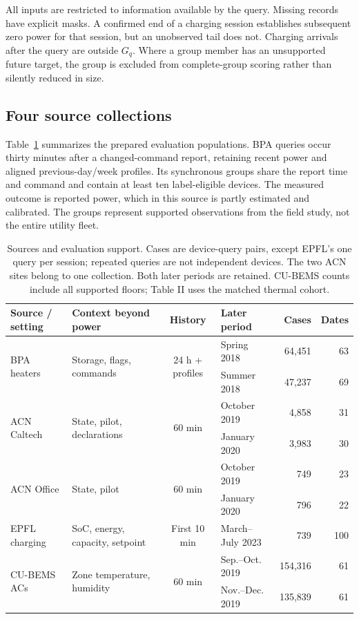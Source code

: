 \documentclass[conference,a4paper]{IEEEtran}
\begin{document}
All inputs are restricted to information available by the query. Missing
records have explicit masks. A confirmed end of a charging session
establishes subsequent zero power for that session, but an unobserved tail
does not. Charging arrivals after the query are outside $G_q$. Where a
group member has an unsupported future target, the group is excluded from
complete-group scoring rather than silently reduced in size.

\subsection{Four source collections}
Table~\ref{tab:sources} summarizes the prepared evaluation populations.
BPA queries occur thirty minutes after a changed-command report, retaining
recent power and aligned previous-day/week profiles. Its synchronous groups
share the report time and command and contain at least ten label-eligible
devices. The measured outcome is reported power, which in this source is
partly estimated and calibrated. The groups represent supported observations
from the field study, not the entire utility fleet.

\begin{table}[t]
\caption{Sources and evaluation support. Cases are device-query pairs, except
EPFL's one query per session; repeated queries are not independent devices.
The two ACN sites belong to one collection. Both later periods are retained.
CU-BEMS counts include all supported floors; Table II uses the matched thermal cohort.}
\label{tab:sources}
\centering\small
\setlength{\tabcolsep}{4pt}
\begin{tabular}{@{}llclrr@{}}
\toprule
Source / setting & Context beyond power & History & Later period & Cases & Dates\\
\midrule
\multirow{2}{*}{BPA heaters} & \multirow{2}{*}{Storage, flags, commands} & \multirow{2}{*}{24 h + profiles} & Spring 2018 &64,451&63\\
&&&Summer 2018&47,237&69\\
\multirow{2}{*}{ACN Caltech} & \multirow{2}{*}{State, pilot, declarations} & \multirow{2}{*}{60 min} & October 2019&4,858&31\\
&&&January 2020&3,983&30\\
\multirow{2}{*}{ACN Office} & \multirow{2}{*}{State, pilot} & \multirow{2}{*}{60 min} & October 2019&749&23\\
&&&January 2020&796&22\\
EPFL charging&SoC, energy, capacity, setpoint&First 10 min&March--July 2023&739&100\\
\multirow{2}{*}{CU-BEMS ACs} & \multirow{2}{*}{Zone temperature, humidity} & \multirow{2}{*}{60 min} & Sep.--Oct. 2019&154,316&61\\
&&&Nov.--Dec. 2019&135,839&61\\
\bottomrule
\end{tabular}
\end{table}
\end{document}
